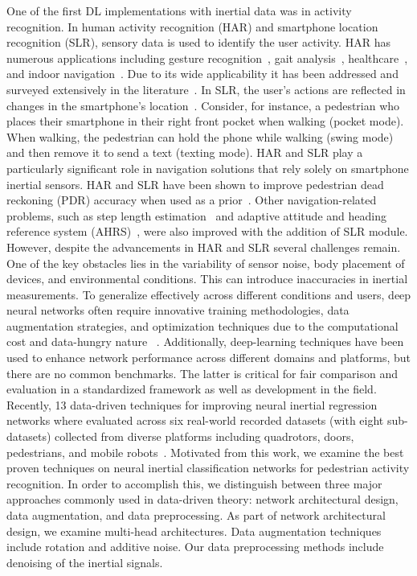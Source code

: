 \documentclass[journal]{IEEEtran}
\begin{document}
One of the first DL implementations with inertial data was in activity recognition.  In human activity recognition (HAR) and smartphone location recognition (SLR), sensory data is used to identify the user activity. HAR has numerous applications including gesture recognition~\cite{ling2021comparative}, gait analysis~\cite{mason2023wearables}, healthcare~\cite{saeed2022intelligent}, and indoor navigation~\cite{shavit2021boosting}. Due to its wide applicability it has been addressed and surveyed extensively in the literature~\cite{qiu2022multi, gu2021survey, chen2021deep}. In SLR, the user's actions are reflected in changes in the smartphone's location~\cite{klein2019smartphone}. Consider, for instance, a pedestrian who places their smartphone in their right front pocket when walking (pocket mode). When walking, the pedestrian can hold the phone while walking (swing mode) and then remove it to send a text (texting mode). HAR and SLR play a particularly significant role in navigation solutions that rely solely on smartphone inertial sensors. HAR and SLR have been shown to improve pedestrian dead reckoning (PDR) accuracy when used as a prior~\cite{yang2016pacp, elhoushi2015online, klein2018pedestrian, KLEIN2025104077}. Other navigation-related problems, such as step length estimation~\cite{chen2018ionet, wang2019pedestrian, klein2020stepnet} and adaptive attitude and heading reference system (AHRS)~\cite{vertzberger2021attitude,vertzberger2022adaptive}, were also improved with the addition of SLR module.\\
\noindent However, despite the advancements in HAR and SLR several challenges remain. One of the key obstacles lies in the variability of sensor noise, body placement of devices, and environmental conditions. This can introduce inaccuracies in inertial measurements. To generalize effectively across different conditions and users, deep neural networks often require innovative training methodologies, data augmentation strategies, and optimization techniques due to the computational cost and data-hungry nature~\cite{bengio2013deep, kawaguchi2017generalization}
. Additionally, deep-learning techniques have been used to enhance network performance across different domains and platforms, but there are no common benchmarks. The latter is critical for fair comparison and evaluation in a standardized framework as well as development in the field.\\
\noindent 
Recently, 13 data-driven techniques for improving neural inertial regression networks where evaluated  across six real-world recorded datasets (with eight sub-datasets) collected from diverse platforms including quadrotors, doors, pedestrians, and mobile robots~\cite{fekson2025enhancement}. Motivated from this work, we examine the best proven techniques on neural inertial classification networks for pedestrian activity recognition. In order to accomplish this, we distinguish between three major approaches commonly used in data-driven theory: network architectural design, data augmentation, and data preprocessing. As part of network architectural design, we examine multi-head architectures. Data augmentation techniques include rotation and additive noise. Our data preprocessing methods include denoising of the inertial signals.\\
\end{document}
